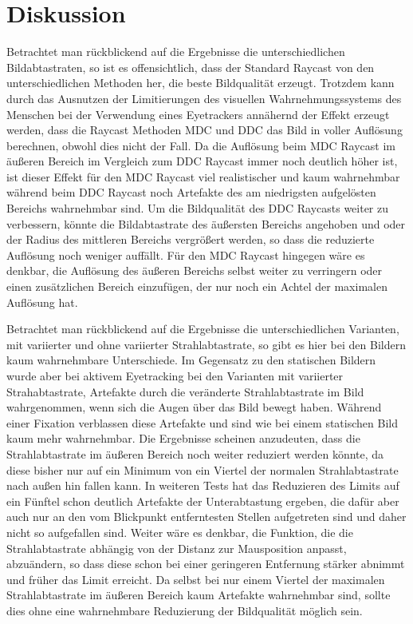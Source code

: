 \section{Diskussion}\label{sec::disc}
Betrachtet man rückblickend auf die Ergebnisse die unterschiedlichen Bildabtastraten, so ist es offensichtlich, dass der Standard Raycast von den unterschiedlichen Methoden her, die beste Bildqualität erzeugt.
Trotzdem kann durch das Ausnutzen der Limitierungen des visuellen Wahrnehmungssystems des Menschen bei der Verwendung eines Eyetrackers annähernd der Effekt erzeugt werden, dass die Raycast Methoden MDC und DDC das Bild in voller Auflösung berechnen, obwohl dies nicht der Fall.
Da die Auflösung beim MDC Raycast im äußeren Bereich im Vergleich zum DDC Raycast immer noch deutlich höher ist, ist dieser Effekt für den MDC Raycast viel realistischer und kaum wahrnehmbar während beim DDC Raycast noch Artefakte des am niedrigsten aufgelösten Bereichs wahrnehmbar sind.
Um die Bildqualität des DDC Raycasts weiter zu verbessern, könnte die Bildabtastrate des äußersten Bereichs angehoben und oder der Radius des mittleren Bereichs vergrößert werden, so dass die reduzierte Auflösung noch weniger auffällt.
Für den MDC Raycast hingegen wäre es denkbar, die Auflösung des äußeren Bereichs selbst weiter zu verringern oder einen zusätzlichen Bereich einzufügen, der nur noch ein Achtel der maximalen Auflösung hat.

Betrachtet man rückblickend auf die Ergebnisse die unterschiedlichen Varianten, mit variierter und ohne variierter Strahlabtastrate, so gibt es hier bei den Bildern kaum wahrnehmbare Unterschiede.
Im Gegensatz zu den statischen Bildern wurde aber bei aktivem Eyetracking bei den Varianten mit variierter Strahabtastrate, Artefakte durch die veränderte Strahlabtastrate im Bild wahrgenommen, wenn sich die Augen über das Bild bewegt haben.
Während einer Fixation verblassen diese Artefakte und sind wie bei einem statischen Bild kaum mehr wahrnehmbar.
Die Ergebnisse scheinen anzudeuten, dass die Strahlabtastrate im äußeren Bereich noch weiter reduziert werden könnte, da diese bisher nur auf ein Minimum von ein Viertel der normalen Strahlabtastrate nach außen hin fallen kann.
In weiteren Tests hat das Reduzieren des Limits auf ein Fünftel schon deutlich Artefakte der Unterabtastung ergeben, die dafür aber auch nur an den vom Blickpunkt entferntesten Stellen aufgetreten sind und daher nicht so aufgefallen sind.
Weiter wäre es denkbar, die Funktion, die die Strahlabtastrate abhängig von der Distanz zur Mausposition anpasst, abzuändern, so dass diese schon bei einer geringeren Entfernung stärker abnimmt und früher das Limit erreicht.
Da selbst bei nur einem Viertel der maximalen Strahlabtastrate im äußeren Bereich kaum Artefakte wahrnehmbar sind, sollte dies ohne eine wahrnehmbare Reduzierung der Bildqualität möglich sein.

